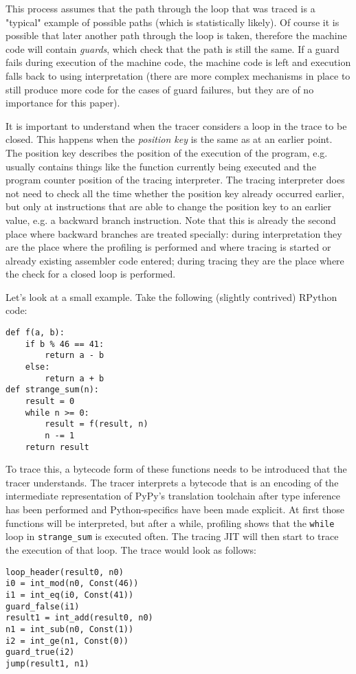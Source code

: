 \documentclass{acm_proc_article-sp}
\begin{document}
This process assumes that the path through the loop that was traced is a
"typical" example of possible paths (which is statistically likely). Of course
it is possible that later another path through the loop is taken, therefore the
machine code will contain \emph{guards}, which check that the path is still the same.
If a guard fails during execution of the machine code, the machine code is left
and execution falls back to using interpretation (there are more complex
mechanisms in place to still produce more code for the cases of guard failures,
but they are of no importance for this paper).

It is important to understand when the tracer considers a loop in the trace to
be closed. This happens when the \emph{position key} is the same as at an earlier
point. The position key describes the position of the execution of the program,
e.g. usually contains things like the function currently being executed and the
program counter position of the tracing interpreter. The tracing interpreter
does not need to check all the time whether the position key already occurred
earlier, but only at instructions that are able to change the position key
to an earlier value, e.g. a backward branch instruction. Note that this is
already the second place where backward branches are treated specially: during
interpretation they are the place where the profiling is performed and where
tracing is started or already existing assembler code entered; during tracing
they are the place where the check for a closed loop is performed.

Let's look at a small example. Take the following (slightly contrived) RPython
code:
\begin{verbatim}
def f(a, b):
    if b % 46 == 41:
        return a - b
    else:
        return a + b
def strange_sum(n):
    result = 0
    while n >= 0:
        result = f(result, n)
        n -= 1
    return result
\end{verbatim}

To trace this, a bytecode form of these functions needs to be introduced that
the tracer understands. The tracer interprets a bytecode that is an encoding of
the intermediate representation of PyPy's translation toolchain after type
inference has been performed and Python-specifics have been made explicit. At
first those functions will be interpreted, but after a while, profiling shows
that the \texttt{while} loop in \texttt{strange\_sum} is executed often.  The
tracing JIT will then start to trace the execution of that loop.  The trace would
look as follows:
\begin{verbatim}
loop_header(result0, n0)
i0 = int_mod(n0, Const(46))
i1 = int_eq(i0, Const(41))
guard_false(i1)
result1 = int_add(result0, n0)
n1 = int_sub(n0, Const(1))
i2 = int_ge(n1, Const(0))
guard_true(i2)
jump(result1, n1)
\end{verbatim}
\end{document}
